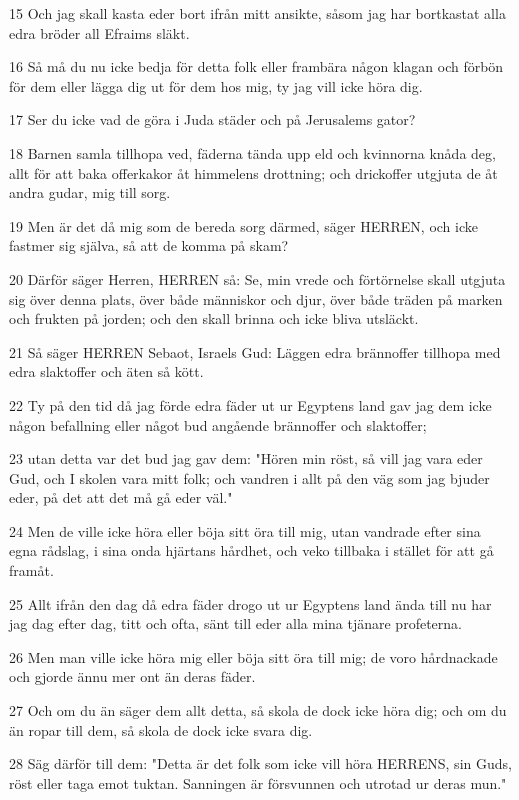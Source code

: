 \par 15 Och jag skall kasta eder bort ifrån mitt ansikte, såsom jag har bortkastat alla edra bröder all Efraims släkt.
\par 16 Så må du nu icke bedja för detta folk eller frambära någon klagan och förbön för dem eller lägga dig ut för dem hos mig, ty jag vill icke höra dig.
\par 17 Ser du icke vad de göra i Juda städer och på Jerusalems gator?
\par 18 Barnen samla tillhopa ved, fäderna tända upp eld och kvinnorna knåda deg, allt för att baka offerkakor åt himmelens drottning; och drickoffer utgjuta de åt andra gudar, mig till sorg.
\par 19 Men är det då mig som de bereda sorg därmed, säger HERREN, och icke fastmer sig själva, så att de komma på skam?
\par 20 Därför säger Herren, HERREN så: Se, min vrede och förtörnelse skall utgjuta sig över denna plats, över både människor och djur, över både träden på marken och frukten på jorden; och den skall brinna och icke bliva utsläckt.
\par 21 Så säger HERREN Sebaot, Israels Gud: Läggen edra brännoffer tillhopa med edra slaktoffer och äten så kött.
\par 22 Ty på den tid då jag förde edra fäder ut ur Egyptens land gav jag dem icke någon befallning eller något bud angående brännoffer och slaktoffer;
\par 23 utan detta var det bud jag gav dem: "Hören min röst, så vill jag vara eder Gud, och I skolen vara mitt folk; och vandren i allt på den väg som jag bjuder eder, på det att det må gå eder väl."
\par 24 Men de ville icke höra eller böja sitt öra till mig, utan vandrade efter sina egna rådslag, i sina onda hjärtans hårdhet, och veko tillbaka i stället för att gå framåt.
\par 25 Allt ifrån den dag då edra fäder drogo ut ur Egyptens land ända till nu har jag dag efter dag, titt och ofta, sänt till eder alla mina tjänare profeterna.
\par 26 Men man ville icke höra mig eller böja sitt öra till mig; de voro hårdnackade och gjorde ännu mer ont än deras fäder.
\par 27 Och om du än säger dem allt detta, så skola de dock icke höra dig; och om du än ropar till dem, så skola de dock icke svara dig.
\par 28 Säg därför till dem: "Detta är det folk som icke vill höra HERRENS, sin Guds, röst eller taga emot tuktan. Sanningen är försvunnen och utrotad ur deras mun."
